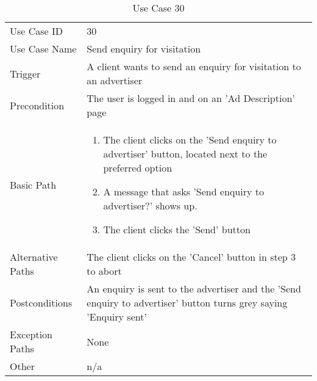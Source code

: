 \begin{table}[H]
\centering
\label{table-use-case-30}
\begin{tabular}{|p{3cm}|p{10cm}}
Use Case ID       & 30                                                           
\\
Use Case Name     & Send enquiry for visitation                                                         
\\
Trigger           & A client wants to send an enquiry for visitation to an
advertiser
\\
Precondition      & The user is logged in and on an 'Ad Description' page                                                
\\
Basic Path        & \begin{enumerate}
\item The client clicks on the 'Send enquiry to advertiser' button, located next
to the preferred option
\item A message that asks 'Send enquiry to advertiser?' shows up.
\item The client clicks the 'Send' button
\end{enumerate} 
     \\
Alternative Paths & The client clicks on the 'Cancel' button in step 3 to abort                      
\\
Postconditions    & An enquiry is sent to the advertiser and the 'Send enquiry
to advertiser' button turns grey saying 'Enquiry sent'
\\
Exception Paths   & None                          \\
Other             & n/a                                                                                                                                                                                                        
\end{tabular}
\caption{Use Case 30}
\end{table}

